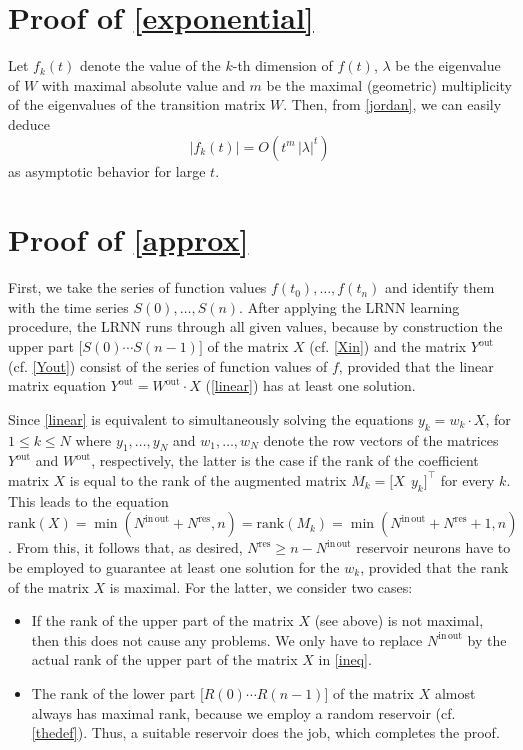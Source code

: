 \documentclass{sn-jnl}
\theoremstyle{definition}
\begin{document}
{\section{Proof of \cref{exponential}}\label{proof:exponential}

Let $f_k(t)$ denote the value of the $k$-th dimension of $f(t)$, $\lambda$ be
the eigenvalue of $W$ with maximal absolute value and $m$ be the maximal (geometric)
multiplicity of the eigenvalues of the transition matrix $W$. Then, from
\cref{jordan}, we can easily deduce \[ |f_k(t)| = O(t^m\,|\lambda|^t) \]
as asymptotic behavior for large $t$.

\section{Proof of \cref{approx}}\label{proof:approx}

First, we take the series of function values $f(t_0),\dots,f(t_n)$ and identify
them with the time series $S(0),\dots,S(n)$. After applying the LRNN learning
procedure, the LRNN runs through all given values, because by construction the
upper part $\big[ S(0) \cdots S(n-1) \big]$ of the matrix $X$ (cf. \cref{Xin})
and the matrix $Y^\mathrm{out}$ (cf. \cref{Yout}) consist of the series of
function values of $f$, provided that the linear
matrix equation $Y^\mathrm{out} = W^\mathrm{out} \cdot X$ (\cref{linear}) has at
least one solution.

Since \cref{linear} is equivalent to simultaneously solving the equations $y_k =
w_k \cdot X$, for $1 \le k \le N$ where $y_1,\dots,y_N$ and $w_1,\dots,w_N$
denote the row vectors of the matrices $Y^\mathrm{out}$ and $W^\mathrm{out}$,
respectively, the latter is the case if the rank of the coefficient matrix $X$
is equal to the rank of the augmented matrix $M_k = \big[ X ~~ y_k \big]^\top$
for every $k$. This leads to the equation $\mathrm{rank}(X) =
\min(N^\mathrm{in\,out}+N^\mathrm{res},n) = \mathrm{rank}(M_k) =
\min(N^\mathrm{in\,out}+N^\mathrm{res}+1,n)$. From this, it follows that, as
desired, $N^\mathrm{res} \ge n-N^\mathrm{in\,out}$ reservoir neurons have to be
employed to guarantee at least one solution for the $w_k$, provided that the
rank of the matrix $X$ is maximal. For the latter, we consider two cases:
\begin{itemize}
  \item If the rank of the upper part of the matrix $X$ (see above) is not
	maximal, then this does not cause any problems. We only have to replace
	$N^\mathrm{in\,out}$ by the actual rank of the upper part of the matrix
	$X$ in \cref{ineq}.
  \item The rank of the lower part $\big[ R(0) \cdots R(n-1) \big]$ of the
	matrix $X$ almost always has maximal rank, because we employ a random
	reservoir (cf. \cref{thedef}). Thus, a suitable reservoir does the job,
	which completes the proof.
\end{itemize}}
\end{document}
